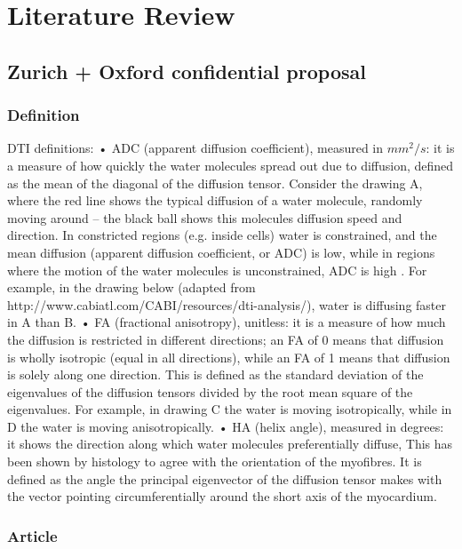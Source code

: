 \chapter{Literature Review}

\section{Zurich + Oxford confidential proposal}

\subsection{Definition}

DTI definitions:
• ADC (apparent diffusion coefficient), measured in $mm^2/s$: it is a measure of how quickly the water molecules spread out
due to diffusion, defined as the mean of the diagonal of the diffusion tensor. Consider the drawing A, where the red line shows the typical diffusion of a water molecule, randomly moving around – the black ball shows this molecules diffusion speed and direction. In constricted regions (e.g. inside cells) water is constrained, and the mean diffusion (apparent diffusion coefficient, or ADC) is low, while in regions where the motion of the water molecules is unconstrained, ADC is high . For example, in the drawing below (adapted from http://www.cabiatl.com/CABI/resources/dti-analysis/), water is diffusing faster in A than B.
• FA (fractional anisotropy), unitless: it is a measure of how much the diffusion is restricted in different directions; an FA of 0 means that diffusion is wholly isotropic (equal in all directions), while an FA of 1 means that diffusion is solely along one direction. This is defined as the standard deviation of the eigenvalues of the diffusion tensors divided by the root mean square of the eigenvalues. For example, in drawing C the water is moving isotropically, while
in D the water is moving anisotropically.
• HA (helix angle), measured in degrees: it shows the direction along which water molecules preferentially diffuse, This has been shown by histology to agree with the orientation of the myofibres. It is defined as the angle the principal eigenvector of the diffusion tensor makes with the vector pointing circumferentially around the short axis of the myocardium.


\subsection{Article}

